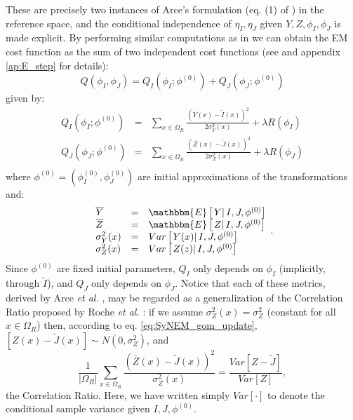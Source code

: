 These are precisely two instances of Arce's formulation (eq. (1) of \cite{Arce-santana2014}) in the reference space, and the conditional independence of $\eta_{I}, \eta_{J}$
given $Y, Z, \phi_{I}, \phi_{J}$ is made explicit. By performing similar computations as in \cite{Arce-santana2014} we can obtain the EM cost function as the sum of two
independent cost functions (see \cite{Arce-santana2014} and appendix \ref{ap:E_step} for details):
\begin{equation}\label{eq:SyNEM_energy}
    Q(\phi_{I}, \phi_{J}) = Q_{I}(\phi_{I}; \phi^{(0)}) + Q_{J}(\phi_{J}; \phi^{(0)})
\end{equation}
given by:
\begin{equation}\label{eq:SyNEM_energy_split}
    \begin{array}{lll}
        Q_{I}(\phi_{I}; \phi^{(0)}) &=& \sum_{x \in \Omega_{R}} \frac{\left(\overline{Y}(x) - \tilde{I}(x)\right)^{2}}{2\sigma^{2}_{Y}(x)} + \lambda R(\phi_{I}) \\
        Q_{J}(\phi_{J}; \phi^{(0)}) &=& \sum_{x \in \Omega_{R}} \frac{\left(\overline{Z}(x) - \tilde{J}(x)\right)^{2}}{2\sigma^{2}_{Z}(x)} + \lambda R(\phi_{J}) \\
    \end{array}
\end{equation}
where $\phi^{(0)} = (\phi_{I}^{(0)}, \phi_{J}^{(0)})$ are initial approximations of the transformations and:
\begin{equation}\label{eq:E_Step_stats}
    \begin{array}{lll}
        \overline{Y} &=& \mathbbm{E}\left[\left.Y \right| I, J, \phi^{(0)}\right]\\
        \overline{Z} &=& \mathbbm{E}\left[\left.Z \right| I, J, \phi^{(0)}\right]\\
        \sigma_{Y}^{2}(x) &=& Var\left[\left.Y(x) \right| I, J, \phi^{(0)}\right]\\
        \sigma_{Z}^{2}(x) &=& Var\left[\left.Z(z) \right| I, J, \phi^{(0)}\right]
    \end{array}.
\end{equation}
Since $\phi^{(0)}$ are fixed initial parameters, $Q_{I}$ only depends on $\phi_{I}$ (implicitly, through $\tilde{I}$), and $Q_{J}$ only depends on $\phi_{J}$. Notice that each of
these metrics, derived by Arce {\it et al.} \cite{Arce-santana2014}, may be regarded as a generalization of the Correlation Ratio proposed by
Roche {\it et al.} \cite{Roche1998}: if we assume $\sigma^{2}_{Z}(x) = \sigma^{2}_{Z}$ (constant for all $x\in\Omega_{R}$) then, according to
eq. \eqref{eq:SyNEM_gom_update},\hbox{$\left[Z(x) - \tilde{J}(x)\right] \sim N(0, \sigma^{2}_{Z})$}, and
\begin{equation}
    \frac{1}{|\Omega_{R}|}\sum_{x \in \Omega_{R}} \frac{\left(\overline{Z}(x) - \tilde{J}(x)\right)^{2}}{\sigma^{2}_{Z}(x)} =
    \frac{Var\left[Z - \tilde{J}\right]}{Var\left[Z\right]},
\end{equation}
the Correlation Ratio. Here, we have written simply $Var[\cdot]$ to denote the conditional sample variance given $ I, J, \phi^{(0)}$.\\

